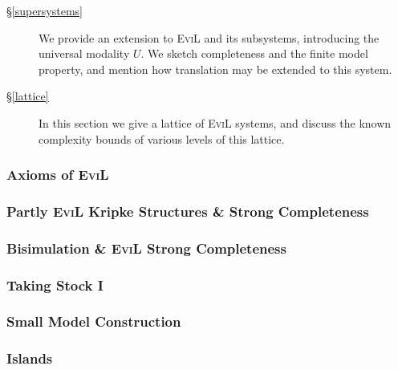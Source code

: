 \begin{description}
  \item[\S\ref{supersystems}] We provide an extension to
    \textsc{EviL} and its subsystems, introducing the universal
    modality $U$. We sketch completeness and the finite model
    property, and mention how translation may be extended to this
    system.

 \item[\S\ref{lattice}]  In this section we give a lattice of
   \textsc{EviL} systems, and discuss the known complexity bounds of
   various levels of this lattice.
\end{description}

%

\subsubsection{Axioms of \textsc{EviL}}\label{evil-axioms}


\pagebreak

\subsubsection{Partly \textsc{EviL} Kripke Structures \& Strong Completeness}\label{abstraction}\label{partly-evil-strong-soundness-and-completeness}


\subsubsection{Bisimulation \& \textsc{EviL} Strong Completeness}\label{completely-evil}\label{Abstract-Completeness}


\subsubsection{Taking Stock I}\label{taking-stock}


\subsubsection{Small Model Construction}\label{small-model}


\subsubsection{Islands}\label{islands}


